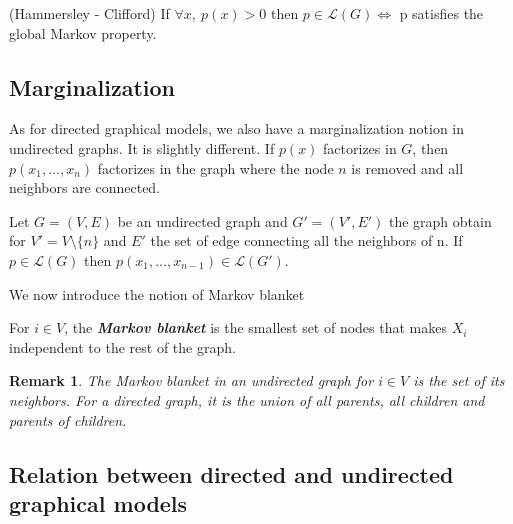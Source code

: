 \documentclass[12pt]{report}
\newtheorem{remark}{Remark}[section]
\begin{document}
\begin{theorem} 
(Hammersley - Clifford) If $\forall x, \ p(x) > 0$ then $p \in \mathcal{L}(G) \iff $ p satisfies the global Markov property.
\end{theorem}

\subsection{Marginalization}

As for directed graphical models, we also have a marginalization notion in undirected graphs. It is slightly different. If $p(x)$ factorizes in $G$, then $p(x_1,\dots,x_n)$ factorizes in the graph where the node $n$ is removed and all neighbors are connected.


\begin{proposition}
Let $G = (V, E)$ be an undirected graph and $G' = (V', E')$ the graph obtain for $V' = V \setminus \{n\}$ and $E'$ the set of edge connecting all the neighbors of n. If $p \in \mathcal{L}(G)$ then $p(x_1, ..., x_{n-1}) \in \mathcal{L}(G')$.
\end{proposition}


We now introduce the notion of Markov blanket
\begin{definition}
For $i \in V$, the \emph{\textbf{Markov blanket}} is the smallest set of nodes that makes $X_i$ independent to the rest of the graph.
\end{definition}

\begin{remark}
The Markov blanket in an undirected graph for $i \in V$ is the set of its neighbors. For a directed graph, it is the union of all parents, all children and parents of children.
\end{remark}


\subsection{Relation between directed and undirected graphical models}
\end{document}
